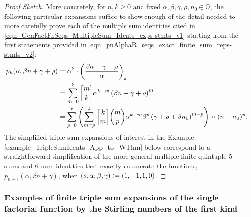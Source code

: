 \documentclass[12pt,reqno]{article}
\numberwithin{sfootnote}{section}
\numberwithin{equation}{section}
\theoremstyle{plain}
\theoremstyle{definition}
\theoremstyle{remark}
\newcommand{\defequals}{\ensuremath{\vcentcolon=}}
\newcommand{\gkpSI}[2]{\ensuremath{\genfrac{\lbrack}{\rbrack}{0pt}{}{#1}{#2}}}
\newcommand{\Pochhammer}[2]{\ensuremath{\left(#1\right)_{#2}}}
\begin{document}
\begin{proof}[Proof Sketch] 
More concretely, 
for $n, k \geq 0$ and fixed 
$\alpha, \beta, \gamma, \rho, n_0 \in \mathbb{Q}$, the 
following particular expansions 
suffice to show enough of the detail needed to more carefully prove 
each of the multiple sum identities cited in 
\eqref{eqn_GenFactFnSeqs_MultipleSum_Idents_exps-stmts_v1} 
starting from the first statements provided in 
\eqref{eqn_pnAlphaR_seqs_exact_finite_sum_reps-stmts_v2}: 
\begin{align*} 
p_k(\alpha, \beta n + \gamma + \rho) 
     & = 
     \alpha^k \cdot \Pochhammer{\frac{\beta n + \gamma + \rho}{\alpha}}{k} \\ 
     & = 
     \sum_{m=0}^{k} \gkpSI{m}{k} \alpha^{k-m} 
     \left(\beta n + \gamma + \rho\right)^{m} \\ 
     & = 
     \sum_{p=0}^{k} \left( 
     \sum_{m=p}^{k} \gkpSI{k}{m} \binom{m}{p} \alpha^{k-m} \beta^{p} 
     \left(\gamma + \rho + \beta n_0\right)^{m-p} 
     \right) \times (n - n_0)^{p}. 
\end{align*} 
The simplified 
triple sum expansions of interest in the 
Example \ref{example_TripleSumIdents_App_to_WThm} below 
correspond to a straightforward 
simplification of the more general multiple finite quintuple $5$--sums and 
$6$--sum identities  
that exactly enumerate the functions, $p_{n-s}(\alpha, \beta n + \gamma)$, 
when $(s, \alpha, \beta, \gamma) \defequals (1, -1, 1, 0)$. 
\end{proof} 

\subsubsection{Examples of finite triple sum expansions of the 
               single factorial function by the 
               Stirling numbers of the first kind} 
\end{document}
